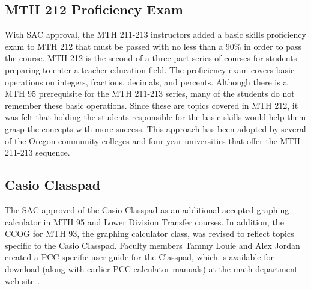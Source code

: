 \subsection{MTH 212 Proficiency Exam}
With SAC approval, the MTH 211-213 instructors added a basic skills proficiency
exam to MTH 212 that must be passed with no less than a 90\% in order to pass
the course.  MTH 212 is the second of a three part series of courses for
students preparing to enter a teacher education field. The proficiency exam
covers basic operations on integers, fractions, decimals, and percents.
Although there is a MTH 95 prerequisite for the MTH 211-213 series, many of the
students do not remember these basic operations. Since these are topics covered
in MTH 212, it was felt that holding the students responsible for the basic
skills would help them grasp the concepts with more success.  This approach has
been adopted by several of the Oregon community colleges and four-year
universities that offer the MTH 211-213 sequence.

\subsection{Casio Classpad}
The SAC approved of the Casio Classpad as an additional accepted graphing
calculator in MTH 95 and Lower Division Transfer courses. In addition, the CCOG
for MTH 93, the graphing calculator class, was revised to reflect topics
specific to the Casio Classpad. Faculty members Tammy Louie and Alex Jordan
created a PCC-specific user guide for the Classpad, which is available for
download (along with earlier PCC calculator manuals) at the math department web
site \cite{pccmathdept}. 
